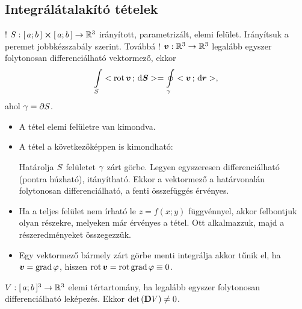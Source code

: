 \documentclass[main.tex]{subfiles}
\begin{document}
\subsection{Integrálátalakító tételek}


! ${S} :
  [\, a; b \,] \cross [\, a; b \,]
  \rightarrow \mathbb{R}^3$ irányított, parametrizált,
elemi felület. Irányítsuk a peremet jobbkézszabály szerint.
Továbbá ! $\boldsymbol{v} : \mathbb{R}^3 \rightarrow \mathbb{R}^3$
legalább egyszer folytonosan differenciálható vektormező,
ekkor
\begin{equation*}
  \int \limits_\rsurf{S}
  \scalar{\rot \rvec{v}}{\differential \vsurf{S}}
  =
  \oint \limits_{\rcurve{\gamma}}
  \scalar{\rvec{v}}{\differential \rvec{r}},
\end{equation*}
ahol ${\gamma} = \partial {S}$.



\begin{itemize}
  \item A tétel elemi felületre van kimondva.


  \item A tétel a következőképpen is kimondható:

        Határolja ${S}$ felületet ${\gamma}$
        zárt görbe. Legyen egyszeresen differenciálható
        (pontra húzható), itányítható. Ekkor a vektormező
        a határvonalán folytonosan differenciálható, a
        fenti összefüggés érvényes.


  \item Ha a teljes felület nem írható le $z = f(x;y)$
        függvénnyel, akkor felbontjuk olyan részekre,
        melyeken már érvényes a tétel. Ott alkalmazzuk,
        majd a részeredményeket összegezzük.

  \item Egy vektormező bármely zárt görbe menti integrálja
        akkor tűnik el, ha $\boldsymbol{v} = \operatorname{grad} \varphi$,
        hiszen $\operatorname{rot} \boldsymbol{v} = \operatorname{rot} \operatorname{grad} \varphi \equiv 0$.
\end{itemize}




${V} : [\, a; b \,]^3 \rightarrow \mathbb{R}^3$
elemi tértartomány, ha legalább egyszer folytonosan
differenciálható leképezés. Ekkor
$\det \left( \mathbf{D} {V} \right) \neq 0$.
\end{document}
